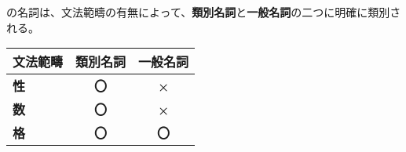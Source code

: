 \langname の名詞は、文法範疇の有無によって、\textbf{類別名詞}と\textbf{一般名詞}の二つに明確に類別される。

\begin{tabular}{|l|c|c|}
    \hline
    \textbf{文法範疇} & \textbf{類別名詞} & \textbf{一般名詞} \\
    \hline
    \textbf{性} & \textbf{〇} & \textbf{×} \\
    \textbf{数} & \textbf{〇} & \textbf{×} \\
    \textbf{格} & \textbf{〇} & \textbf{〇} \\
    \hline
\end{tabular}